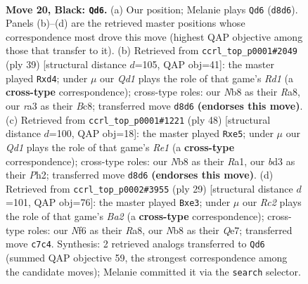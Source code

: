 \documentclass[11pt]{article}
\begin{document}
\clearpage

\begin{figure}[p]\centering
\begin{subfigure}{0.46\textwidth}\centering
\resizebox{\linewidth}{!}{%
\newchessgame
\chessboard[
  setfen={rnbq2k1/2r2p2/Pp3np1/3p2Np/P2P1P1P/R1NB2P1/3K4/3Q3R b - - 0 20},
  showmover=false,
  pgfstyle=straightmove, color=movearrow, markmove={d8-d6}
]}
\caption{}
\end{subfigure}\hfill
\begin{subfigure}{0.46\textwidth}\centering
\resizebox{\linewidth}{!}{%
\newchessgame
\chessboard[
  setfen={r1br2k1/p3q1b1/2p1p3/1p2PpN1/1npP1P2/7Q/PP2BKP1/R6R b - - 7 20},
  showmover=false,
  pgfstyle=straightmove, color=movearrow, markmove={d8-d4}
]}
\caption{}
\end{subfigure}
\\[4pt]
\begin{subfigure}{0.46\textwidth}\centering
\resizebox{\linewidth}{!}{%
\newchessgame
\chessboard[
  setfen={1r1q1rk1/1p1b3p/p7/2pPp3/PnB2pp1/NQ3P2/1P4PP/R3R2K w - - 0 25},
  showmover=false,
  pgfstyle=straightmove, color=movearrow, markmove={e1-e5}
]}
\caption{}
\end{subfigure}\hfill
\begin{subfigure}{0.46\textwidth}\centering
\resizebox{\linewidth}{!}{%
\newchessgame
\chessboard[
  setfen={r3k2r/bpp1qppp/p1n2n2/4p1N1/PPN1P3/2PPB3/6PP/R2QK2R b KQkq - 2 15},
  showmover=false,
  pgfstyle=straightmove, color=movearrow, markmove={a7-e3}
]}
\caption{}
\end{subfigure}
\caption{\textbf{Move 20, Black: \texttt{Qd6}.} (a) Our position; Melanie plays \texttt{Qd6} (\texttt{d8d6}). Panels (b)--(d) are the retrieved master positions whose correspondence most drove this move (highest QAP objective among those that transfer to it). (b) Retrieved from \texttt{ccrl\_top\_p0001\#2049} (ply 39) [structural distance $d$=105, QAP obj=41]: the master played \texttt{Rxd4}; under $\mu$ our \emph{Qd1} plays the role of that game's \emph{Rd1} (a \textbf{cross-type} correspondence); cross-type roles: our \emph{N}b8 as their \emph{R}a8, our \emph{r}a3 as their \emph{B}c8; transferred move \texttt{d8d6} \textbf{(endorses this move)}. (c) Retrieved from \texttt{ccrl\_top\_p0001\#1221} (ply 48) [structural distance $d$=100, QAP obj=18]: the master played \texttt{Rxe5}; under $\mu$ our \emph{Qd1} plays the role of that game's \emph{Re1} (a \textbf{cross-type} correspondence); cross-type roles: our \emph{N}b8 as their \emph{R}a1, our \emph{b}d3 as their \emph{P}h2; transferred move \texttt{d8d6} \textbf{(endorses this move)}. (d) Retrieved from \texttt{ccrl\_top\_p0002\#3955} (ply 29) [structural distance $d$=101, QAP obj=76]: the master played \texttt{Bxe3}; under $\mu$ our \emph{Rc2} plays the role of that game's \emph{Ba2} (a \textbf{cross-type} correspondence); cross-type roles: our \emph{N}f6 as their \emph{R}a8, our \emph{N}b8 as their \emph{Q}e7; transferred move \texttt{c7c4}. Synthesis: 2 retrieved analogs transferred to \texttt{Qd6} (summed QAP objective 59, the strongest correspondence among the candidate moves); Melanie committed it via the \texttt{search} selector.}
\label{fig:thought-m39}
\end{figure}
\end{document}
